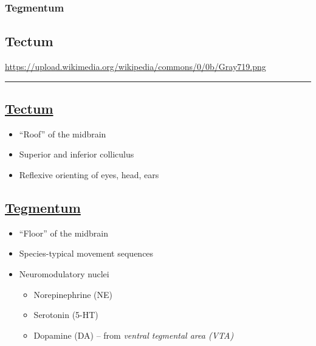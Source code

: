 \documentclass[]{article}
\providecommand{\tightlist}{%
  \setlength{\itemsep}{0pt}\setlength{\parskip}{0pt}}
\begin{document}
\subsubsection{Tegmentum}\label{tegmentum}

\subsection{Tectum}\label{tectum-1}

\url{https://upload.wikimedia.org/wikipedia/commons/0/0b/Gray719.png}

\begin{center}\rule{0.5\linewidth}{\linethickness}\end{center}

\subsection{\texorpdfstring{\href{https://en.wikipedia.org/wiki/Tectum}{Tectum}}{Tectum}}\label{tectum-2}

\begin{itemize}
\tightlist
\item
  ``Roof'' of the midbrain
\item
  Superior and inferior colliculus
\item
  Reflexive orienting of eyes, head, ears
\end{itemize}

\subsection{\texorpdfstring{\href{https://en.wikipedia.org/wiki/Tegmentum}{Tegmentum}}{Tegmentum}}\label{tegmentum-1}

\begin{itemize}
\tightlist
\item
  ``Floor'' of the midbrain
\item
  Species-typical movement sequences
\item
  Neuromodulatory nuclei

  \begin{itemize}
  \tightlist
  \item
    Norepinephrine (NE)
  \item
    Serotonin (5-HT)
  \item
    Dopamine (DA) -- from \emph{ventral tegmental area (VTA)}
  \end{itemize}
\end{itemize}
\end{document}
